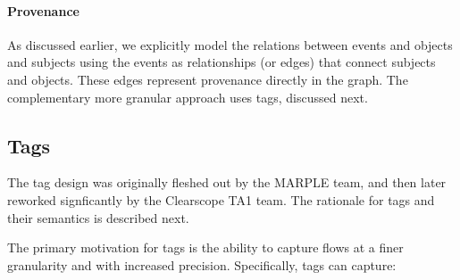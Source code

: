 \documentclass[10pt, conference, onecolumn]{IEEEtran}
\begin{document}
\paragraph{Provenance}

As discussed earlier, we explicitly model the relations between events
and objects and subjects using the events as relationships (or edges)
that connect subjects and objects. These edges represent provenance
directly in the graph. The complementary more granular approach uses
tags, discussed next.

\subsection{Tags} \label{sec:tags}

The tag design was originally fleshed out by the MARPLE team, and then
later reworked signficantly by the Clearscope TA1 team. The rationale
for tags and their semantics is described next.

The primary motivation for tags is the ability to capture flows at a
finer granularity and with increased precision. Specifically, tags can
capture:
\end{document}
